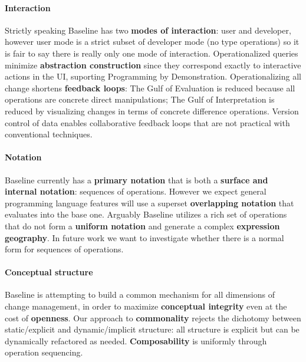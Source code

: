 \documentclass[english,submission]{programming}
\theoremstyle{definition}
\begin{document}
\paragraph{Interaction} Strictly speaking Baseline has two \textbf{modes of interaction}: user and developer, however user mode is a strict subset of developer mode (no type operations) so it is fair to say there is really only one mode of interaction.
Operationalized queries minimize \textbf{abstraction construction} since they correspond exactly to interactive actions in the UI, suporting Programming by Demonstration.
Operationalizing all change shortens \textbf{feedback loops}: The Gulf of Evaluation is reduced because all operations are concrete direct manipulations; The Gulf of Interpretation is reduced by visualizing changes in terms of concrete difference operations. Version control of data enables collaborative feedback loops that are not practical with conventional techniques.

\paragraph{Notation} Baseline currently has a \textbf{primary notation} that is both a \textbf{surface and internal notation}: sequences of operations. However we expect general programming language features will use a superset \textbf{overlapping notation} that evaluates into the base one. Arguably Baseline utilizes a rich set of operations that do not form a \textbf{uniform notation} and generate a complex \textbf{expression geography}. In future work we want to investigate whether there is a normal form for sequences of operations.

\paragraph{Conceptual structure} Baseline is attempting to build a common mechanism for all dimensions of change management, in order to maximize \textbf{conceptual integrity} even at the cost of \textbf{openness}. Our approach to \textbf{commonality} rejects the  dichotomy between static/explicit and dynamic/implicit structure: all structure is explicit but can be dynamically refactored as needed. \textbf{Composability} is uniformly through operation sequencing.
\end{document}
